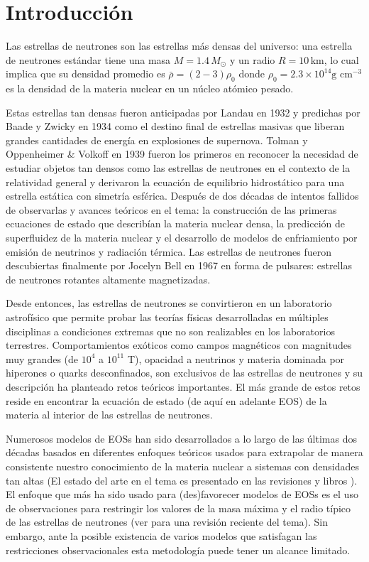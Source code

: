 \chapter*{Introducción}

\noindent Las estrellas de neutrones son las estrellas más densas del universo: una estrella de neutrones estándar tiene una masa $M= 1.4\,M_{\odot}$ y un radio $R=10\,\text{km}$, lo cual implica que su densidad promedio es $\bar{\rho}=(2-3)\rho_0$ donde $\rho_{0}=2.3\times 10^{14} \text{g cm}^{-3}$ es la densidad de la materia nuclear en un núcleo atómico pesado. 

Estas estrellas tan densas fueron anticipadas por Landau en 1932 \cite{Yakovlev2013} y predichas por Baade y Zwicky en 1934 \cite{Baade1934} como el destino final de estrellas masivas que liberan grandes cantidades de energía en explosiones de supernova. Tolman y Oppenheimer \& Volkoff en 1939 \cite{Tolman1939,Oppenheimer1939} fueron los primeros en reconocer la necesidad de estudiar objetos tan densos como las estrellas de neutrones en el contexto de la relatividad general y derivaron la ecuación de equilibrio hidrostático para una estrella estática con simetría esférica. Después de dos décadas de intentos fallidos de observarlas y avances teóricos en el tema: la construcción de las primeras ecuaciones de estado que describían la materia nuclear densa, la predicción de superfluidez de la materia nuclear y el desarrollo de modelos de enfriamiento por emisión de neutrinos y radiación térmica. Las estrellas de neutrones fueron descubiertas finalmente por Jocelyn Bell en 1967 \cite{Hewish1968} en forma de pulsares: estrellas de neutrones rotantes altamente magnetizadas.

Desde entonces, las estrellas de neutrones se convirtieron en un laboratorio astrofísico que permite probar las teorías físicas desarrolladas en múltiples disciplinas a condiciones extremas que no son realizables en los laboratorios terrestres. Comportamientos exóticos como campos magnéticos con magnitudes muy grandes (de $10^4$ a $10^{11}$ T), opacidad a neutrinos y materia dominada por hiperones o quarks desconfinados, son exclusivos de las estrellas de neutrones y su descripción ha planteado retos teóricos importantes. El más grande de estos retos reside en encontrar la ecuación de estado (de aquí en adelante EOS) de la materia al interior de las estrellas de neutrones. 

Numerosos modelos de EOSs han sido desarrollados a lo largo de las últimas dos décadas basados en diferentes enfoques teóricos usados para extrapolar de manera consistente nuestro conocimiento de la materia nuclear a sistemas con densidades tan altas (El estado del arte en el tema es presentado en las revisiones \cite{Ozel2016,Oertel2017} y libros \cite{Haensel2007,Rezzolla2018}). El enfoque que más ha sido usado para (des)favorecer modelos de EOSs es el uso de observaciones para restringir los valores de la masa máxima y el radio típico de las estrellas de neutrones (ver \cite{Lattimer2019} para una revisión reciente del tema). Sin embargo, ante la posible existencia de varios modelos que satisfagan las restricciones observacionales esta metodología puede tener un alcance limitado.   


